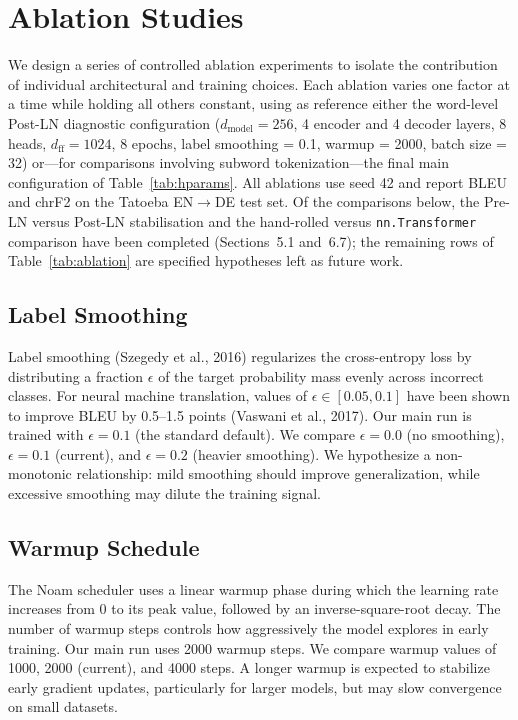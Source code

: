 \section{Ablation Studies}

We design a series of controlled ablation experiments to isolate the contribution of individual architectural and training choices. Each ablation varies one factor at a time while holding all others constant, using as reference either the word-level Post-LN diagnostic configuration ($d_{\text{model}}=256$, 4 encoder and 4 decoder layers, 8 heads, $d_{\text{ff}}=1024$, 8 epochs, label smoothing = 0.1, warmup = 2000, batch size = 32) or---for comparisons involving subword tokenization---the final main configuration of Table~\ref{tab:hparams}. All ablations use seed 42 and report BLEU and chrF2 on the Tatoeba EN$\rightarrow$DE test set. Of the comparisons below, the Pre-LN versus Post-LN stabilisation and the hand-rolled versus \texttt{nn.Transformer} comparison have been completed (Sections~5.1 and~6.7); the remaining rows of Table~\ref{tab:ablation} are specified hypotheses left as future work.

\subsection{Label Smoothing}

Label smoothing (Szegedy et al., 2016) regularizes the cross-entropy loss by distributing a fraction $\epsilon$ of the target probability mass evenly across incorrect classes. For neural machine translation, values of $\epsilon \in [0.05, 0.1]$ have been shown to improve BLEU by 0.5--1.5 points (Vaswani et al., 2017). Our main run is trained with $\epsilon = 0.1$ (the standard default). We compare $\epsilon = 0.0$ (no smoothing), $\epsilon = 0.1$ (current), and $\epsilon = 0.2$ (heavier smoothing). We hypothesize a non-monotonic relationship: mild smoothing should improve generalization, while excessive smoothing may dilute the training signal.

\subsection{Warmup Schedule}

The Noam scheduler uses a linear warmup phase during which the learning rate increases from 0 to its peak value, followed by an inverse-square-root decay. The number of warmup steps controls how aggressively the model explores in early training. Our main run uses 2000 warmup steps. We compare warmup values of 1000, 2000 (current), and 4000 steps. A longer warmup is expected to stabilize early gradient updates, particularly for larger models, but may slow convergence on small datasets.

